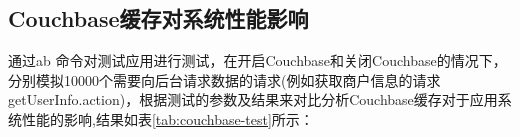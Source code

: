 
\subsection{Couchbase缓存对系统性能影响}
通过ab 命令对测试应用进行测试，在开启Couchbase和关闭Couchbase的情况下，分别模拟10000个需要向后台请求数据的请求(例如获取商户信息的请求getUserInfo.action)，根据测试的参数及结果来对比分析Couchbase缓存对于应用系统性能的影响,结果如表\ref{tab:couchbase-test}所示：




